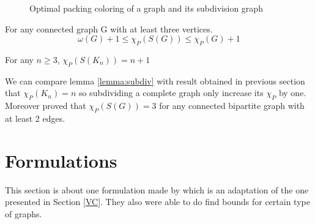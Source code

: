 \begin{figure}[h]
\centering
{}
\caption{Optimal packing coloring of a graph and its subdivision graph}
\label{fig:subdiv}
\end{figure}


\begin{thm}
\label{thm:subdiv}
For any connected graph G with at least three vertices.
\[\omega(G) + 1 \leq \chi_P(S(G)) \leq \chi_P(G) + 1\]
\end{thm}

\begin{lemma}
\label{lemma:subdiv}
For any $n \geq 3$, $\chi_P(S(K_n)) =  n+1 $
\end{lemma}

We can compare lemma \ref{lemma:subdiv} with result obtained in previous section that $\chi_P(K_n) = n$ so subdividing a complete graph only increase its $\chi_P$ by one. Moreover \cite{broadcastchromatic} proved that $\chi_P(S(G)) = 3$ for any connected bipartite graph with at least 2 edges.


\section{Formulations}
\label{sec:PF_Form}

This section is about one formulation made by \cite{PCModel} which is an adaptation of the one presented in Section \ref{VC}. They also were able to do find bounds for certain type of graphs.\\

